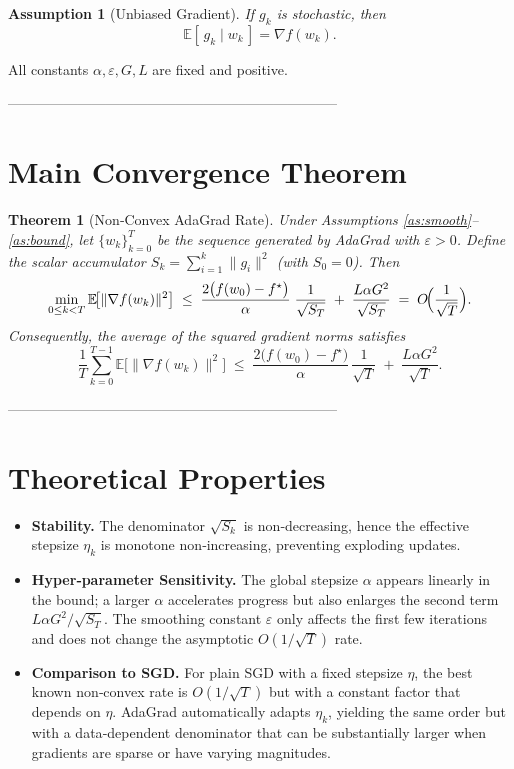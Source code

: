 \documentclass[11pt]{article}
\newtheorem{theorem}{Theorem}
\newtheorem{assumption}{Assumption}
\newcommand{\E}{\mathbb{E}}
\begin{document}
\begin{assumption}[Unbiased Gradient]\label{as:unbiased}
If $g_{k}$ is stochastic, then
\[
\E[\,g_{k}\mid w_{k}\,]=\nabla f(w_{k}).
\]
\end{assumption}

All constants $\alpha,\varepsilon,G,L$ are fixed and positive.

-----------------------------------------------------------------------

\section*{Main Convergence Theorem}
\begin{theorem}[Non‑Convex AdaGrad Rate]\label{thm:rate}
Under Assumptions \ref{as:smooth}–\ref{as:bound}, let $\{w_{k}\}_{k=0}^{T}$ be the
sequence generated by AdaGrad with $\varepsilon>0$. Define the scalar
accumulator $S_{k}= \sum_{i=1}^{k} \|g_{i}\|^{2}$ (with $S_{0}=0$). Then
\[
\min_{0\le k<T}\E\!\bigl[\|\nabla f(w_{k})\|^{2}\bigr]
\;\le\;
\frac{2\bigl(f(w_{0})-f^{\star}\bigr)}{\alpha}
\;\frac{1}{\sqrt{S_{T}}}
\;+\;
\frac{L\alpha G^{2}}{\sqrt{S_{T}}}
\;=\;O\!\Bigl(\frac{1}{\sqrt{T}}\Bigr).
\]
Consequently, the average of the squared gradient norms satisfies
\[
\frac{1}{T}\sum_{k=0}^{T-1}\E\!\bigl[\|\nabla f(w_{k})\|^{2}\bigr]
\;\le\;
\frac{2\bigl(f(w_{0})-f^{\star}\bigr)}{\alpha}\,
\frac{1}{\sqrt{T}}
\;+\;
\frac{L\alpha G^{2}}{\sqrt{T}} .
\]
\end{theorem}

-----------------------------------------------------------------------

\section*{Theoretical Properties}
\begin{itemize}
\item \textbf{Stability.} The denominator $\sqrt{S_{k}}$ is non‑decreasing,
hence the effective stepsize $\eta_{k}$ is monotone non‑increasing,
preventing exploding updates.
\item \textbf{Hyper‑parameter Sensitivity.}
  The global stepsize $\alpha$ appears linearly in the bound; a larger
  $\alpha$ accelerates progress but also enlarges the second term
  $L\alpha G^{2}/\sqrt{S_{T}}$.
  The smoothing constant $\varepsilon$ only affects the first few
  iterations and does not change the asymptotic $O(1/\sqrt{T})$ rate.
\item \textbf{Comparison to SGD.}
  For plain SGD with a fixed stepsize $\eta$, the best known
  non‑convex rate is $O(1/\sqrt{T})$ but with a constant factor that
  depends on $\eta$. AdaGrad automatically adapts $\eta_{k}$,
  yielding the same order but with a data‑dependent denominator that can be
  substantially larger when gradients are sparse or have varying magnitudes.
\end{itemize}
\end{document}
